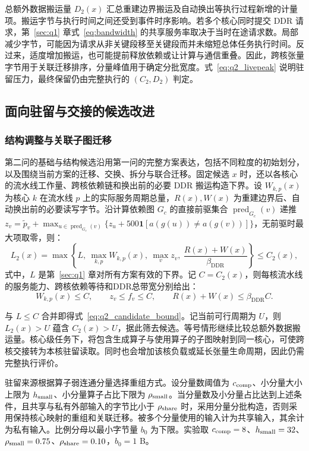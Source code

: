 总额外数据搬运量 $D_2(x)$ 汇总重建边界搬运及自动换出等执行过程新增的计量项。搬运字节与执行时间之间还受到事件时序影响。若多个核心同时提交 DDR 请求，第~\ref{sec:q1} 章式~\eqref{eq:bandwidth} 的共享服务率取决于当时在途请求数。局部减少字节，可能因为请求从非关键段移至关键段而并未缩短总体任务执行时间。反过来，适度增加搬运，也可能提前释放依赖或让计算与通信重叠。因此，跨核张量字节用于关联迁移排序，分量峰值用于确定分批宽度。式~\eqref{eq:q2_livepeak} 说明驻留压力，最终保留仍由完整执行的 $(C_2,D_2)$ 判定。

\subsection{面向驻留与交接的候选改进}
\subsubsection{结构调整与关联子图迁移}
第二问的基础与结构候选沿用第一问的完整方案表达，包括不同粒度的初始划分，以及围绕当前方案的迁移、交换、拆分与联合迁移。固定候选 $x$ 时，还以各核心的流水线工作量、跨核依赖链和换出前的必要 DDR 搬运构造下界。设 $W_{k,p}(x)$ 为核心 $k$ 在流水线 $p$ 上的实际服务周期总量，$R(x),W(x)$ 为重建边界后、自动换出前的必要读写字节。沿计算依赖图 $G_c$ 的直接前驱集合 $\operatorname{pred}_{G_c}(v)$ 递推 $z_v=\widetilde p_v+\max_{u\in\operatorname{pred}_{G_c}(v)}\{z_u+500\mathbf1[a(g(u))\ne a(g(v))]\}$，无前驱时最大项取零，则：
\begin{equation}
 L_2(x)=\max\!\left\{L,\ \max_{k,p}W_{k,p}(x),\ \max_v z_v,\
 \frac{R(x)+W(x)}{\beta_{\mathrm{DDR}}}\right\}\le C_2(x),
 \label{eq:q2_candidate_bound}
\end{equation}
\noindent 式中，$L$ 是第~\ref{sec:q1} 章对所有方案有效的下界。记 $C=C_2(x)$，则每核流水线的服务能力、跨核依赖等待和DDR总带宽分别给出：
\[
 W_{k,p}(x)\le C,\qquad z_v\le f_v\le C,\qquad
 R(x)+W(x)\le\beta_{\mathrm{DDR}}C.
\]

与 $L\le C$ 合并即得式~\eqref{eq:q2_candidate_bound}。记当前可行周期为 $U$，则 $L_2(x)>U$ 蕴含 $C_2(x)>U$，据此筛去候选。等号情形继续比较总额外数据搬运量。核心级任务下，将包含生成算子与使用算子的子图映射到同一核心，可使跨核交接转为本核驻留读取。同时也会增加该核负载或延长张量生命周期，因此仍需完整执行评价。

驻留来源根据算子弱连通分量选择重组方式。设分量数阈值为 $c_{\rm comp}$、小分量大小上限为 $h_{\rm small}$、小分量算子占比下限为 $\rho_{\rm small}$。当分量数及小分量占比达到上述条件，且共享与私有外部输入的字节比小于 $\rho_{\rm share}$ 时，采用分量分批构造，否则采用保持核心映射的重组和关联迁移。被多个分量使用的输入计为共享输入，其余计为私有输入。比例分母以最小字节量 $b_0$ 为下限。实验取 $c_{\rm comp}=8$、$h_{\rm small}=32$、$\rho_{\rm small}=0.75$、$\rho_{\rm share}=0.10$，$b_0=1$ B。

